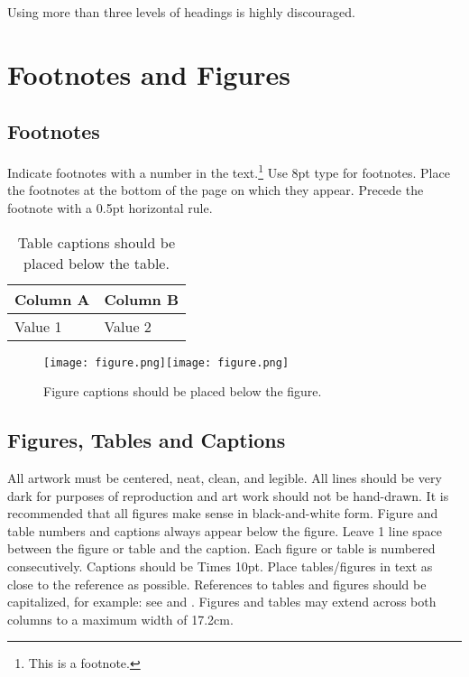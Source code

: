 \documentclass{article}
\begin{document}
Using more than three levels of headings is highly discouraged.

\section{Footnotes and Figures}

\subsection{Footnotes}

Indicate footnotes with a number in the text.\footnote{This is a footnote.} 
Use 8pt type for footnotes. Place the footnotes at the bottom of the page on which they appear. 
Precede the footnote with a 0.5pt horizontal rule.

\begin{table}[h]
 \begin{center}
 \begin{tabular}{|l|l|}
  \hline
  Column A & Column B \\
  \hline
  Value 1  & Value 2 \\
  \hline
 \end{tabular}
\end{center}
 \caption{Table captions should be placed below the table.}
 \label{tab:example}
\end{table}

\begin{figure*}
 \centerline{\texttt{[image: figure.png]}\hskip1.5cm\texttt{[image: figure.png]}}
 \caption{Figure captions should be placed below the figure.}
 \label{fig:example}
\end{figure*}


\subsection{Figures, Tables and Captions}

All artwork must be centered, neat, clean, and legible. 
All lines should be very dark for purposes of reproduction and art work should not be hand-drawn. 
It is recommended that all figures make sense in black-and-white form. 
Figure and table numbers and captions always appear below the figure. 
Leave 1 line space between the figure or table and the caption. 
Each figure or table is numbered consecutively. Captions should be Times 10pt. 
Place tables/figures in text as close to the reference as possible. 
References to tables and figures should be capitalized, for example: 
see  and . 
Figures and tables may extend across both columns to a maximum width of 17.2cm.
\end{document}
